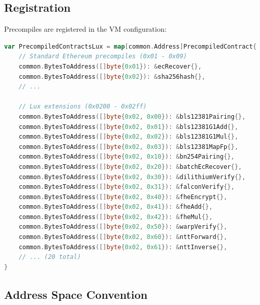 \documentclass[11pt,a4paper]{article}
\begin{document}
\subsection{Registration}

Precompiles are registered in the VM configuration:

\begin{lstlisting}[language=Go,caption={Registering a precompile}]
var PrecompiledContractsLux = map[common.Address]PrecompiledContract{
    // Standard Ethereum precompiles (0x01 - 0x09)
    common.BytesToAddress([]byte{0x01}): &ecRecover{},
    common.BytesToAddress([]byte{0x02}): &sha256hash{},
    // ...

    // Lux extensions (0x0200 - 0x02ff)
    common.BytesToAddress([]byte{0x02, 0x00}): &bls12381Pairing{},
    common.BytesToAddress([]byte{0x02, 0x01}): &bls12381G1Add{},
    common.BytesToAddress([]byte{0x02, 0x02}): &bls12381G1Mul{},
    common.BytesToAddress([]byte{0x02, 0x03}): &bls12381MapFp{},
    common.BytesToAddress([]byte{0x02, 0x10}): &bn254Pairing{},
    common.BytesToAddress([]byte{0x02, 0x20}): &batchEcRecover{},
    common.BytesToAddress([]byte{0x02, 0x30}): &dilithiumVerify{},
    common.BytesToAddress([]byte{0x02, 0x31}): &falconVerify{},
    common.BytesToAddress([]byte{0x02, 0x40}): &fheEncrypt{},
    common.BytesToAddress([]byte{0x02, 0x41}): &fheAdd{},
    common.BytesToAddress([]byte{0x02, 0x42}): &fheMul{},
    common.BytesToAddress([]byte{0x02, 0x50}): &warpVerify{},
    common.BytesToAddress([]byte{0x02, 0x60}): &nttForward{},
    common.BytesToAddress([]byte{0x02, 0x61}): &nttInverse{},
    // ... (20 total)
}
\end{lstlisting}

\subsection{Address Space Convention}
\end{document}
